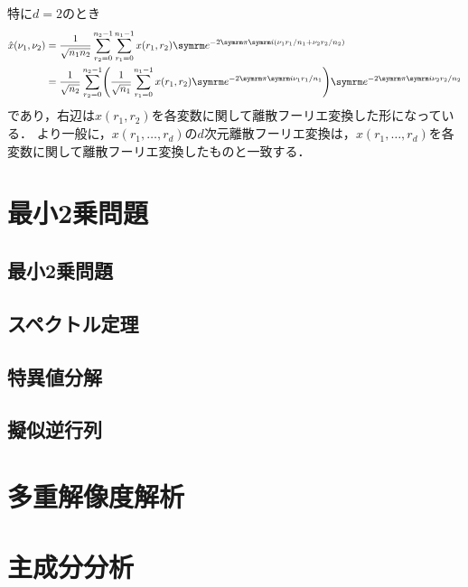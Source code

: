 \documentclass[../../main]{subfiles}
\begin{document}
特に\(d=2\)のとき
\begin{align*}
  \hat{x}(\nu_1,\nu_2) &= \frac{1}{\sqrt{n_1n_2}}\sum_{r_2=0}^{n_2-1}\sum_{r_1=0}^{n_1-1}x(r_1,r_2)\napr^{-2\krez\iuni(\nu_1r_1/n_1+\nu_2r_2/n_2)} \\
  &= \frac{1}{\sqrt{n_2}}\sum_{r_2=0}^{n_2-1}\pqty*{\frac{1}{\sqrt{n_1}}\sum_{r_1=0}^{n_1-1}x(r_1,r_2)\napr^{-2\krez\iuni\nu_1r_1/n_1}}\napr^{-2\krez\iuni\nu_2r_2/n_2}
\end{align*}
であり，右辺は\(x(r_1,r_2)\)を各変数に関して離散フーリエ変換した形になっている．
より一般に，\(x(r_1,\dots,r_d)\)の\(d\)次元離散フーリエ変換は，\(x(r_1,\dots,r_d)\)を各変数に関して離散フーリエ変換したものと一致する．

\section{最小2乗問題}

\subsection{最小2乗問題}

\subsection{スペクトル定理}

\subsection{特異値分解}

\subsection{擬似逆行列}

\section{多重解像度解析}

\section{主成分分析}
\end{document}
